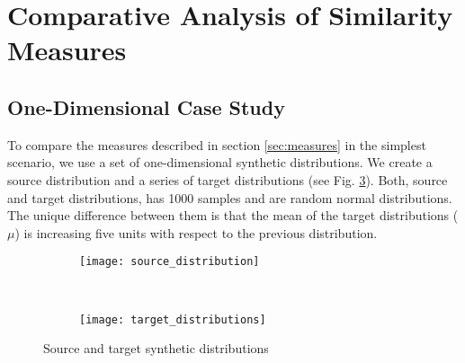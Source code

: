 \section{Comparative Analysis of Similarity Measures}\label{sec:comparison}

\subsection{One-Dimensional Case Study}\label{subsec:1d_case}
To compare the measures described in section \ref{sec:measures} in the simplest scenario, we use a set of one-dimensional synthetic distributions. We create a source distribution and a series of target distributions (see Fig. \ref{fig:source_target_dist}). Both, source and target distributions, has 1000 samples and are random normal distributions. The unique difference between them is that the mean of the target distributions ($\mu$) is increasing five units with respect to the previous distribution.

\begin{figure}[ht] 
	\centering
	\begin{subfigure}[b]{0.45\textwidth}
		\centering
		\texttt{[image: source\_distribution]}	
		\label{fig:source_distribution}
	\end{subfigure}
	~ %
	\begin{subfigure}[b]{0.45\textwidth}
		\centering
		\texttt{[image: target\_distributions]}	
		\label{fig:targert_distributions}
	\end{subfigure}

  \caption{Source and target synthetic distributions}
  \label{fig:source_target_dist}
\end{figure}


